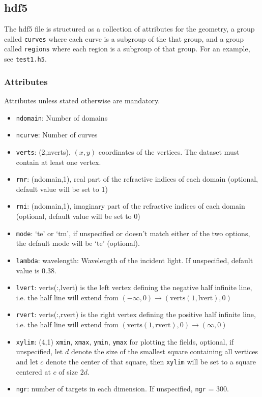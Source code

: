\documentclass[11pt]{article}
\theoremstyle{definition}
\theoremstyle{remark}
\numberwithin{equation}{section}
\begin{document}
\subsection{hdf5}
The hdf5 file is structured as a collection of attributes for the geometry, a group called \texttt{curves} where each curve is a subgroup of the that group, and a group called \texttt{regions} where each region is a subgroup of that group. For an example, see \texttt{test1.h5}.

\subsubsection{Attributes}
Attributes unless stated otherwise are mandatory.
\begin{itemize}
\item \texttt{ndomain}: Number of domains
\item \texttt{ncurve}: Number of curves
\item \texttt{verts}: (2,nverts), $(x,y)$ coordinates of the vertices. The dataset must contain at least one vertex.
\item \texttt{rnr}: (ndomain,1), real part of the refractive indices of each domain (optional, default value will be set to 1)
\item \texttt{rni}: (ndomain,1), imaginary part of the refractive indices of each domain (optional, default value will be set to 0)
\item \texttt{mode}: `te' or `tm', if unspecified or doesn't match either of the two options, the default mode will be `te' (optional).
\item \texttt{lambda}: wavelength: Wavelength of the incident light. If unspecified, default value is $0.38$.
\item \texttt{lvert}: verts(:,lvert) is the left vertex defining the negative half infinite line, i.e. the half line will extend from $(-\infty,0) \to (\textrm{verts}(1,\textrm{lvert}),0)$
\item \texttt{rvert}: verts(:,rvert) is the right vertex defining the positive half infinite line, i.e. the half line will extend from $(\textrm{verts}(1,\textrm{rvert}),0) \to(\infty,0)$
\item \texttt{xylim}: (4,1) \texttt{xmin}, \texttt{xmax}, \texttt{ymin}, \texttt{ymax} for plotting the fields, optional, if unspecified, let $d$ denote the size of the smallest
square containing all vertices and let $c$ denote the center of that square, then \texttt{xylim} will be set to a square centered at $c$ of size $2d$.
\item \texttt{ngr}: number of targets in each dimension. If unspecified, \texttt{ngr} = 300.
\end{itemize}
\end{document}
